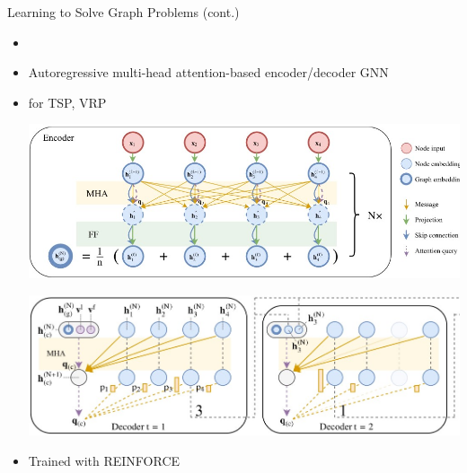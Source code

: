 \documentclass[aspectratio=1610]{beamer}
\newcommand{\important}[1]{{\color{green!60!black}#1}}
\begin{document}

\begin{frame}{Learning to Solve Graph Problems (cont.)}
	\begin{itemize}
		\item {}
		\item Autoregressive multi-head attention-based encoder/decoder GNN
		\item for TSP, VRP
		\begin{center}
			\includegraphics[width=0.7\linewidth]{figures/MHA-encoder.jpg}
		\end{center}
		\begin{center}
			\includegraphics[width=0.7\linewidth]{figures/MHA-decoder.jpg}
		\end{center}
		\item Trained with REINFORCE
	\end{itemize}
\end{frame}
\end{document}
